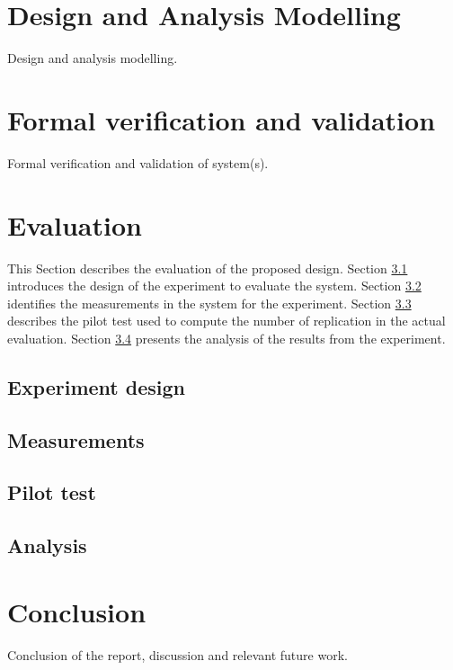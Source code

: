 \documentclass[conference]{IEEEtran}
\begin{document}
\section{Design and Analysis Modelling}
\label{sec:design_and_analysis_modelling}
Design and analysis modelling.

\section{Formal verification and validation}
\label{sec:formal_v_and_v}
Formal verification and validation of system(s).


\section{Evaluation}
\label{sec:evaluation}

This Section describes the evaluation of the proposed design.
Section \ref{sec:design} introduces the design of the experiment to evaluate the system. 
Section \ref{sec:measurements} identifies the measurements in the system for the experiment.
Section \ref{sec:pilot_test} describes the pilot test used to compute the number of replication in the actual evaluation. 
Section \ref{sec:analysis} presents the analysis of the results from the experiment. 

\subsection{Experiment design}
\label{sec:design}

\subsection{Measurements}
\label{sec:measurements}

\subsection{Pilot test}
\label{sec:pilot_test}

\subsection{Analysis}
\label{sec:analysis}


\section{Conclusion}
\label{sec:conclusion}
Conclusion of the report, discussion and relevant future work.
\end{document}
